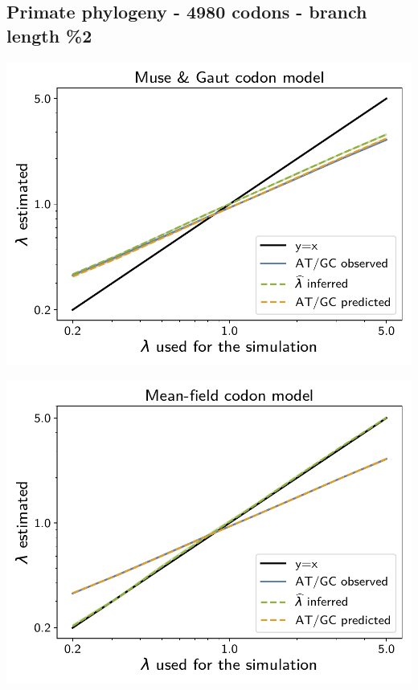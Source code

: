 \documentclass{article}
\begin{document}
\subsection{Primate phylogeny - 4980 codons - branch length \%2}

\begin{center}
    \begin{minipage}{0.325\linewidth}
        \includegraphics[width=\linewidth, page=1]{inference_supp_mat/PrimatesExons10Mu0.5_lambda_MG.pdf}
    \end{minipage}
    \hfill
    \begin{minipage}{0.325\linewidth}
        \includegraphics[width=\linewidth, page=1]{inference_supp_mat/PrimatesExons10Mu0.5_lambda_MF.pdf}

\end{minipage}
\end{center}
\end{document}
